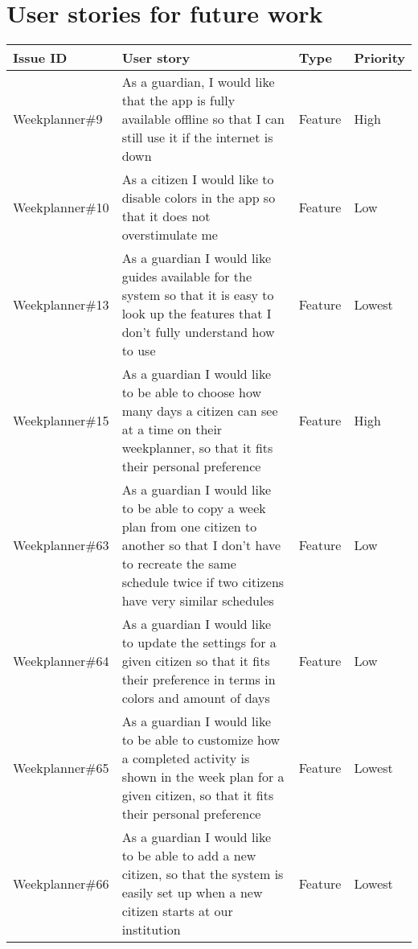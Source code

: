 \newpage
\chapter{User stories for future work}\label{appendix:future-work-user-stories}
\begin{longtable}{|p{2.9cm}|p{7cm}|p{1.4cm}|p{1.5cm}|}
    \hline
    Issue ID         & User story                                                                                                                                                                & Type & Priority     \\ \hline
    Weekplanner\#9   & As a guardian, I would like that the app is fully available offline so that I can still use it if the internet is down                                                    & Feature & High      \\ \hline
    Weekplanner\#10  & As a citizen I would like to disable colors in the app so that it does not overstimulate me                                                                               & Feature & Low      \\ \hline
    Weekplanner\#13  & As a guardian I would like guides available for the system so that it is easy to look up the features that I don't fully understand how to use                            & Feature & Lowest      \\ \hline
    Weekplanner\#15  & As a guardian I would like to be able to choose how many days a citizen can see at a time on their weekplanner, so that it fits their personal preference                 & Feature & High    \\ \hline
    Weekplanner\#63  & As a guardian I would like to be able to copy a week plan from one citizen to another so that I don’t have to recreate the same schedule twice if two citizens have very similar schedules  & Feature & Low  \\ \hline
    Weekplanner\#64  & As a guardian I would like to update the settings for a given citizen so that it fits their preference in terms in colors and amount of days                              & Feature & Low  \\ \hline
    Weekplanner\#65  & As a guardian I would like to be able to customize how a completed activity is shown in the week plan for a given citizen, so that it fits their personal preference      & Feature & Lowest  \\ \hline
    Weekplanner\#66  & As a guardian I would like to be able to add a new citizen, so that the system is easily set up when a new citizen starts at our institution                              & Feature & Lowest \\ \hline

\end{longtable}

